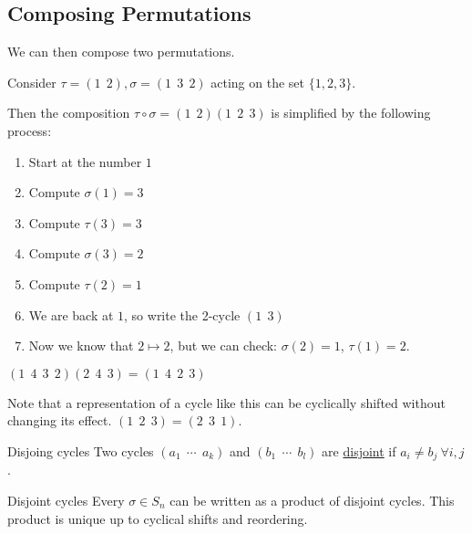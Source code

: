 \documentclass[../Main.tex]{subfiles}
\begin{document}
\subsection{Composing Permutations}
We can then compose two permutations.\par
Consider $\tau = (1~~2), \sigma = (1~~3~~2)$ acting on the set $\{1, 2, 3\}$.\par
Then the composition $\tau \circ \sigma = (1~~2)(1~~2~~3)$ is simplified by the following process:
\begin{enumerate}
    \item Start at the number $1$
    \item Compute $\sigma(1) = 3$
    \item Compute $\tau(3) = 3$
    \item Compute $\sigma(3) = 2$
    \item Compute $\tau(2) = 1$
    \item We are back at $1$, so write the 2-cycle $(1~~3)$
    \item Now we know that $2 \mapsto 2$, but we can check: $\sigma(2) = 1$, $\tau(1) = 2$.
\end{enumerate}
\begin{example}
    $(1~~4~~3~~2)(2~~4~~3) = (1~~4~~2~~3)$
\end{example}
Note that a representation of a cycle like this can be cyclically shifted without changing its effect. $(1~~2~~3) = (2~~3~~1)$.\par
\begin{definition}{Disjoing cycles}
    Two cycles $(a_1~~\cdots~~a_k)$ and $(b_1~~\cdots~~b_l)$ are \underline{disjoint} if $a_i \neq b_j~\forall i, j$.
\end{definition}
\begin{theorem}{Disjoint cycles}
    Every $\sigma \in S_n$ can be written as a product of disjoint cycles. This product is unique up to cyclical shifts and reordering.
\end{theorem}
\end{document}
